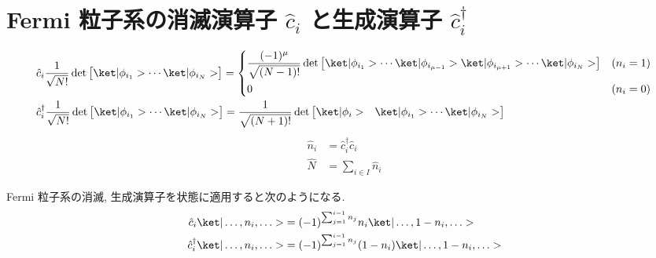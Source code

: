 \documentclass[uplatex,dvipdfmx,a4paper,11pt]{jlreq}
\numberwithin{equation}{section}
\theoremstyle{definition}
\begin{document}
\section{Fermi 粒子系の消滅演算子 $\hat{c}_i$ と生成演算子 $\hat{c}_i^\dagger$}
\begin{definition}
  \begin{align}
     & \hat{c}_i\frac{1}{\sqrt{N!}}\det\begin{bmatrix}\ket|\phi_{i_1}> \cdots \ket|\phi_{i_N}>\end{bmatrix} = \begin{dcases}
                                                                                                                \frac{(-1)^\mu}{\sqrt{(N-1)!}}\det\begin{bmatrix}\ket|\phi_{i_1}> \cdots \ket|\phi_{i_{\mu-1}}>\ket|\phi_{i_{\mu+1}}>\cdots\ket|\phi_{i_N}>\end{bmatrix} & (n_i = 1) \\
                                                                                                                0                                                                                                                                                                                                  & (n_i = 0)
                                                                                                              \end{dcases} \\
     & \hat{c}_i^\dagger\frac{1}{\sqrt{N!}}\det\begin{bmatrix}\ket|\phi_{i_1}> \cdots \ket|\phi_{i_N}>\end{bmatrix} = \frac{1}{\sqrt{(N+1)!}}\det\begin{bmatrix}\ket|\phi_i> & \ket|\phi_{i_1}> \cdots \ket|\phi_{i_N}>\end{bmatrix}
  \end{align}
  \begin{align}
    \hat{n}_i & = \hat{c}_i^\dagger\hat{c}_i \\
    \hat{N}   & = \sum_{i\in I}\hat{n}_i
  \end{align}
\end{definition}
\begin{theorem}[Q21-50, Q21-51]
  Fermi 粒子系の消滅, 生成演算子を状態に適用すると次のようになる.
  \begin{align}
    \hat{c}_i\ket|\ldots,n_i,\ldots>         & = (-1)^{\sum_{j=1}^{i-1}n_j}n_i\ket|\ldots,1-n_i,\ldots>       \\
    \hat{c}_i^\dagger\ket|\ldots,n_i,\ldots> & = (-1)^{\sum_{j=1}^{i-1}n_j}(1 - n_i)\ket|\ldots,1-n_i,\ldots>
  \end{align}
\end{theorem}
\end{document}
